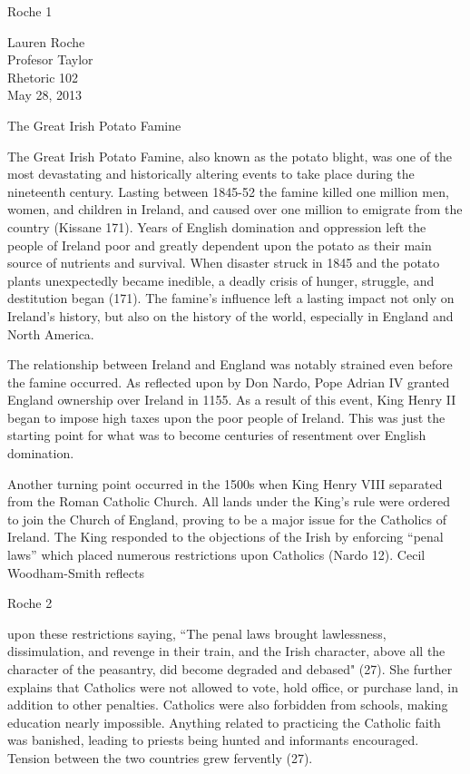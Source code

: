 \newpage

\thispagestyle{empty}
\begin{flushright}Roche 1\end{flushright}
\bigskip
\begin{Spacing}{1.5}
Lauren Roche\\
Profesor Taylor\\
Rhetoric 102\\
May 28, 2013
\end{Spacing}
\begin{center}
The Great Irish Potato Famine
\end{center}
\begin{Spacing}{1.5}

\hspace{.4in}The Great Irish Potato Famine, also known as the potato blight, was one of the most devastating and historically altering events to take place during the nineteenth century. Lasting between 1845-52 the famine killed one million men, women, and children in Ireland, and caused over one million to emigrate from the country (Kissane 171). Years of English domination and oppression left the people of Ireland poor and greatly dependent upon the potato as their main source of nutrients and survival. When disaster struck in 1845 and the potato plants unexpectedly became inedible, a deadly crisis of hunger, struggle, and destitution began (171). The famine’s influence left a lasting impact not only on Ireland’s history, but also on the history of the world, especially in England and North America.

\hspace{.4in}The relationship between Ireland and England was notably strained even before the famine occurred. As reflected upon by Don Nardo, Pope Adrian IV granted England ownership over Ireland in 1155. As a result of this event, King Henry II began to impose high taxes upon the poor people of Ireland. This was just the starting point for what was to become centuries of resentment over English domination. 

Another turning point occurred in the 1500s when King Henry VIII separated from the Roman Catholic Church. All lands under the King’s rule were ordered to join the Church of England, proving to be a major issue for the Catholics of Ireland. The King responded to the objections of the Irish by enforcing “penal laws” which placed numerous restrictions upon Catholics (Nardo 12).  Cecil Woodham-Smith reflects 
\newpage
\thispagestyle{empty}
\begin{flushright}Roche 2\end{flushright}
upon these restrictions saying, “The penal laws brought lawlessness, dissimulation, and revenge in their train, and the Irish character, above all the character of the peasantry, did become degraded and debased" (27).  She further explains that Catholics were not allowed to vote, hold office, or purchase land, in addition to other penalties. Catholics were also forbidden from schools, making education nearly impossible. Anything related to practicing the Catholic faith was banished, leading to priests being hunted and informants encouraged. Tension between the two countries grew fervently (27). 


\end{Spacing}
